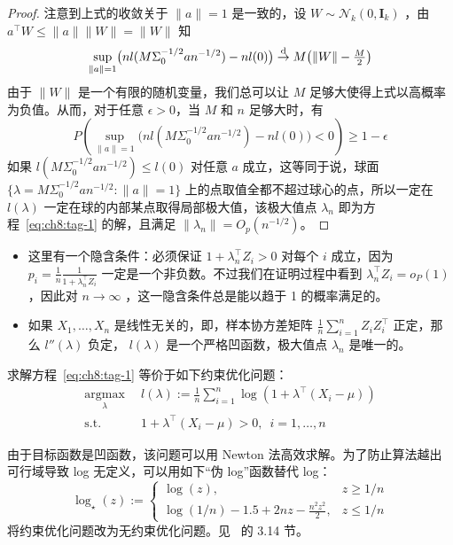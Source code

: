 \begin{proof}
注意到上式的收敛关于 $\|a\|=1$ 是一致的，设 $W\sim \mathcal{N}_k(0,\mathbf I_k)$ ，由 $a^\top W\le \|a\|\|W\|=\|W\|$ 知
\[\sup_{\|a\|=1} \bigl( n l(M \Sigma_0^{-1/2} a n^{-1/2}) - n l(0) \bigr) \overset{\rm d}\to M \bigl( \|W\| - \tfrac{M}{2} \bigr)\]
由于 $\|W\|$ 是一个有限的随机变量，我们总可以让 $M$ 足够大使得上式以高概率为负值。从而，对于任意 $\epsilon > 0$，当 $M$ 和 $n$ 足够大时，有
\[P\left( \sup_{\|a\|=1} \bigl( n l(M \Sigma_0^{-1/2} a n^{-1/2}) - n l(0) \bigr) < 0 \right) \ge 1 - \epsilon\]
如果 $l(M \Sigma_0^{-1/2} a n^{-1/2}) \le l(0)$ 对任意 $a$ 成立，这等同于说，球面 $\{\lambda = M \Sigma_0^{-1/2} a n^{-1/2} : \|a\| =1\}$ 上的点取值全都不超过球心的点，所以一定在 $l(\lambda)$ 一定在球的内部某点取得局部极大值，该极大值点 $\lambda_n$ 即为方程~\eqref{eq:ch8:tag-1} 的解，且满足 $\|\lambda_n\| = O_p(n^{-1/2})$。

\end{proof}

\begin{remark}

\begin{itemize}
\tightlist
\item
  这里有一个隐含条件：必须保证 $1+\lambda_n^\top Z_i> 0$ 对每个 $i$ 成立，因为 $\textstyle p_i = \frac{1}{n}\frac{1}{1 + \lambda_n^\top Z_i}$ 一定是一个非负数。不过我们在证明过程中看到 $\lambda_n^\top Z_i=o_P(1)$ ，因此对 $n\to\infty$ ，这一隐含条件总是能以趋于 1 的概率满足的。
\item
  如果 $X_1,\dots,X_n$ 是线性无关的，即，样本协方差矩阵 $\frac1n\sum_{i=1}^nZ_iZ_i^\top$ 正定，那么 $l''(\lambda)$ 负定， $l(\lambda)$ 是一个严格凹函数，极大值点 $\lambda_n$ 是唯一的。
\end{itemize}
\end{remark}

\begin{corollary*}
求解方程~\eqref{eq:ch8:tag-1} 等价于如下约束优化问题：
\[\begin{aligned} \operatorname*{\arg\max}_\lambda \enspace &l(\lambda):=\frac1n\sum_{i=1}^n\log(1+\lambda^\top (X_i-\mu))\\ \text{s.t. }&1+\lambda^\top(X_i-\mu)> 0,\enspace i=1,\dots,n \end{aligned}\]\end{corollary*}

由于目标函数是凹函数，该问题可以用 Newton 法高效求解。为了防止算法越出可行域导致 log 无定义，可以用如下``伪 log''函数替代 log： \[ \log_\star(z) := \begin{cases} \log(z), & z \ge 1/n\\ \log(1/n) - 1.5 + 2 n z - \frac{n^2 z^2}{2}, & z \le 1/n \end{cases} \]将约束优化问题改为无约束优化问题。见~\cite{owen2001} 的 3.14 节。


